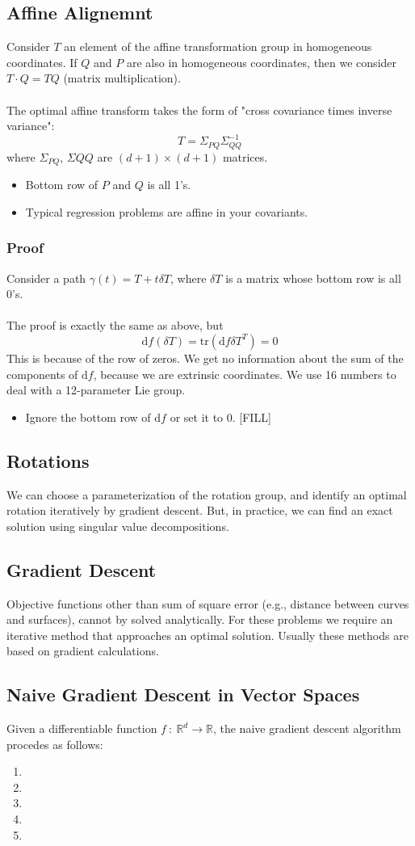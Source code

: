 \documentclass[10pt]{article}
\newcommand{\R}{\mathbb{R}}
\begin{document}
\subsection*{Affine Alignemnt}
Consider $T$ an element of the affine transformation group in homogeneous coordinates.  If $Q$ and $P$ are also in homogeneous coordinates, then we consider $T \cdot Q = TQ$ (matrix multiplication).\\\\
The optimal affine transform takes the form of "cross covariance times inverse variance":
\[T = \Sigma_{PQ} \Sigma_{QQ}^{-1}\]
where $\Sigma_{PQ}$, $\Sigma{QQ}$ are $(d + 1) \times (d + 1)$ matrices.
\begin{itemize}
    \item Bottom row of $P$ and $Q$ is all 1's.
    \item Typical regression problems are affine in your covariants.
\end{itemize}

\subsubsection*{Proof}
Consider a path $\gamma(t) = T + t\delta T$, where $\delta T$ is a matrix whose bottom row is all 0's.\\\\
The proof is exactly the same as above, but
\[\text{d}f (\delta T) = \text{tr} (\text{d}f \delta T^T) = 0\]
This is because of the row of zeros.  We get no information about the sum of the components of $\text{d}f$, because we are extrinsic coordinates.  We use 16 numbers to deal with a 12-parameter Lie group.
\begin{itemize}
    \item Ignore the bottom row of $\text{d}f$ or set it to 0.  [FILL]
\end{itemize}

\subsection*{Rotations}
We can choose a parameterization of the rotation group, and identify an optimal rotation iteratively by gradient descent.  But, in practice, we can find an exact solution using singular value decompositions.

\subsection*{Gradient Descent}
Objective functions other than sum of square error (e.g., distance between curves and surfaces), cannot by solved analytically.  For these problems we require an iterative method that approaches an optimal solution.  Usually these methods are based on gradient calculations.

\subsection*{Naive Gradient Descent in Vector Spaces}
Given a differentiable function $f \::\: \R^d \rightarrow \R$, the naive gradient descent algorithm procedes as follows:
\begin{enumerate}
    \item
    \item
    \item
    \item
    \item
\end{enumerate}
\end{document}
